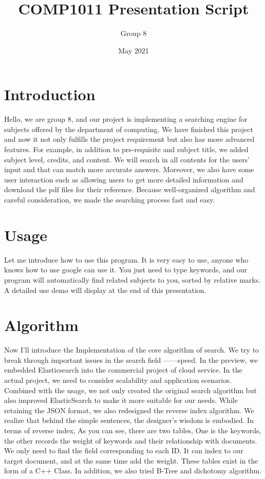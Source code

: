 \documentclass{article}
\title{COMP1011 Presentation Script}
\author{Group 8 }
\date{May 2021}
\begin{document}
\maketitle


\section{Introduction}
Hello, we are group 8, and our project is implementing a searching engine for subjects offered by the department of computing. We have finished this project and now it not only fulfills the project requirement but also has more advanced features. For example, in addition to pre-requisite and subject title, we added subject level, credits, and content. We will search in all contents for the users' input and that can match more accurate answers. Moreover, we also have some user interaction such as allowing users to get more detailed information and download the pdf files for their reference. Because well-organized algorithm and careful consideration, we made the searching process fast and easy.

\section{Usage}
Let me introduce how to use this program. It is very easy to use, anyone who knows how to use google can use it. You just need to type keywords, and our program will automatically find related subjects to you, sorted by relative marks. A detailed use demo will display at the end of this presentation.

\section{Algorithm}
Now I'll introduce the Implementation of the core algorithm of search. We try to break through important issues in the search field ——speed. In the preview, we embedded Elasticsearch into the commercial project of cloud service. In the actual project, we need to consider scalability and application scenarios. Combined with the usage, we not only created the original search algorithm but also improved ElasticSearch to make it more suitable for our needs. While retaining the JSON format, we also redesigned the reverse index algorithm. We realize that behind the simple sentences, the designer's wisdom is embodied. In terms of reverse index, As you can see, there are two tables, One is the keywords, the other records the weight of keywords and their relationship with documents. We only need to find the field corresponding to each ID. It can index to our target document, and at the same time add the weight. These tables exist in the form of a C++ Class. In addition, we also tried B-Tree and dichotomy algorithm.
\end{document}
